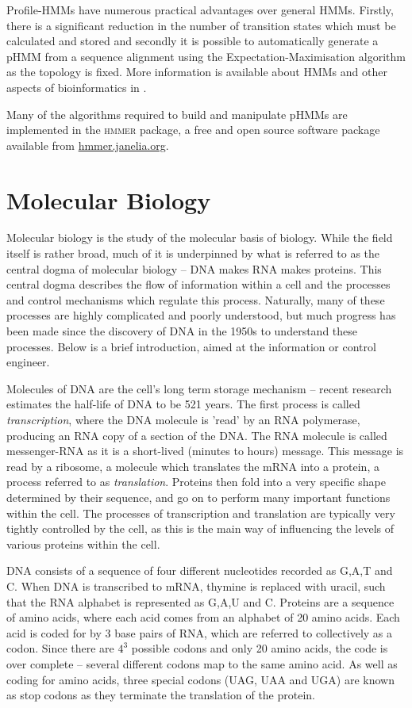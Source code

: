 \documentclass[twoside,a4paper]{article}
\begin{document}
\begin{multicols}{2}
Profile-HMMs have numerous practical advantages over general HMMs. 
Firstly, there is a significant reduction in the number of transition states
which must be calculated and stored and secondly it is possible to 
automatically
generate a pHMM from a sequence alignment using the Expectation-Maximisation
algorithm as the topology is fixed. More information is available about HMMs
and other aspects of bioinformatics in \cite{Durbin1998}.

Many of the algorithms required to build and manipulate pHMMs are implemented
in the \textsc{hmmer}\cite{HMMERguide} package, a free and open source software 
package available from \href{http://hmmer.janelia.org/}{hmmer.janelia.org}.

\section{Molecular Biology}
\label{sec:mbio}

Molecular biology is the study of the molecular basis of biology.
While the field itself is rather broad, much of it is underpinned by what is
referred to as the central dogma of molecular biology -- 
DNA makes RNA makes proteins.
This central dogma describes the flow of information within a cell and the
processes and control mechanisms which regulate this process.
Naturally, many of these processes are highly complicated and poorly
understood, but much progress has been made since the discovery of DNA in the
1950s to understand these processes.
Below is a brief introduction, aimed at the information or control engineer.

Molecules of DNA are the cell's long term storage mechanism -- recent research
estimates the half-life of DNA to be 521 years\cite{DNAhalflife}.
The first process is called \textit{transcription}, where the DNA molecule is
'read' by an RNA polymerase, producing an RNA copy of a section of the DNA.
The RNA molecule is called messenger-RNA as it is a short-lived (minutes to
hours) message.
This message is read by a ribosome, a molecule which translates the mRNA into a
protein, a process referred to as \textit{translation}.
Proteins then fold into a very specific shape determined by their 
sequence, and go on to perform many important functions within the cell.
The processes of transcription and translation are typically very tightly
controlled by the cell, as this is the main way of influencing the levels of
various proteins within the cell.

DNA consists of a sequence of four different nucleotides recorded as G,A,T and C.
When DNA is transcribed to mRNA, thymine is replaced with uracil, such that the
RNA alphabet is represented as G,A,U and C.
Proteins are a sequence of amino acids, where each acid comes from an alphabet
of 20 amino acids.
Each acid is coded for by 3 base pairs of RNA, which are referred to
collectively as a codon.
Since there are $4^3$ possible codons and only 20 amino acids, the code is
over complete -- several different codons map to the same amino acid.
As well as coding for amino acids, three special codons (UAG, UAA and UGA) are
known as stop codons as they terminate the translation of the protein.


\end{multicols}
\end{document}
